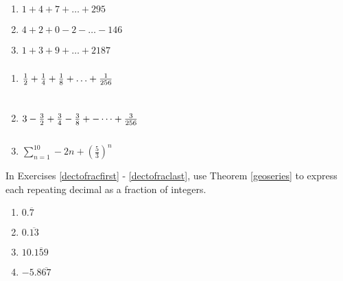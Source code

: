 \begin{multicols}{3}
\begin{enumerate}
\setcounter{enumi}{\value{HW}}

\item  $1+4+7+ \ldots +295$  

\item  $4+2+0-2- \ldots - 146$  

\item $1+3+9+ \ldots + 2187$ 
\setcounter{HW}{\value{enumi}}
\end{enumerate}
\end{multicols}

\begin{multicols}{3}
\begin{enumerate}
\setcounter{enumi}{\value{HW}}

\item  $\frac{1}{2} + \frac{1}{4} + \frac{1}{8} + \ldots + \frac{1}{256}\vphantom{\displaystyle \sum_{n = 1}^{10} -2n + \left(\frac{5}{3}\right)^{n}}$ 

\item $3 - \frac{3}{2} + \frac{3}{4} - \frac{3}{8}+- \dots +\frac{3}{256} \vphantom{\displaystyle \sum_{n = 1}^{10} -2n + \left(\frac{5}{3}\right)^{n}}$



\item $\displaystyle \sum_{n = 1}^{10} -2n + \left(\frac{5}{3}\right)^{n}$ \label{findsumformulalast}

\setcounter{HW}{\value{enumi}}
\end{enumerate}
\end{multicols}

In Exercises \ref{dectofracfirst} - \ref{dectofraclast}, use Theorem \ref{geoseries} to express each repeating decimal as a fraction of integers.

\begin{multicols}{4}

\begin{enumerate}
\setcounter{enumi}{\value{HW}}
\item $0.\overline{7}$ \label{dectofracfirst}
\item $0.\overline{13}$
\item $10.\overline{159}$
\item $-5.8\overline{67}$ \label{dectofraclast}
\setcounter{HW}{\value{enumi}}
\end{enumerate}

\end{multicols}

